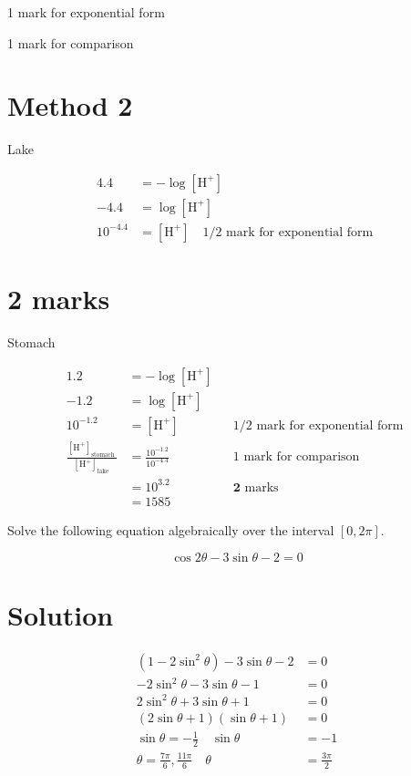 \documentclass[10pt]{article}
\begin{document}
1 mark for exponential form

1 mark for comparison

\section*{Method 2}
Lake

$$
\begin{aligned}
4.4 & =-\log \left[\mathrm{H}^{+}\right] \\
-4.4 & =\log \left[\mathrm{H}^{+}\right] \\
10^{-4.4} & =\left[\mathrm{H}^{+}\right] \quad 1 / 2 \text { mark for exponential form }
\end{aligned}
$$

\section*{2 marks}
Stomach

$$
\begin{aligned}
1.2 & =-\log \left[\mathrm{H}^{+}\right] & & \\
-1.2 & =\log \left[\mathrm{H}^{+}\right] & & \\
10^{-1.2} & =\left[\mathrm{H}^{+}\right] & & 1 / 2 \text { mark for exponential form } \\
\frac{\left[\mathrm{H}^{+}\right]_{\text {stomach }}}{\left[\mathrm{H}^{+}\right]_{\text {lake }}} & =\frac{10^{-1.2}}{10^{-4.4}} & & 1 \text { mark for comparison } \\
& =10^{3.2} & & \mathbf{2} \text { marks } \\
& =1585 & &
\end{aligned}
$$

Solve the following equation algebraically over the interval $[0,2 \pi]$.

$$
\cos 2 \theta-3 \sin \theta-2=0
$$

\section*{Solution}
$$
\begin{aligned}
\left(1-2 \sin ^{2} \theta\right)-3 \sin \theta-2 & =0 \\
-2 \sin ^{2} \theta-3 \sin \theta-1 & =0 \\
2 \sin ^{2} \theta+3 \sin \theta+1 & =0 \\
(2 \sin \theta+1)(\sin \theta+1) & =0 \\
\sin \theta=-\frac{1}{2} \quad \sin \theta & =-1 \\
\theta=\frac{7 \pi}{6}, \frac{11 \pi}{6} \quad \theta & =\frac{3 \pi}{2}
\end{aligned}
$$
\end{document}
